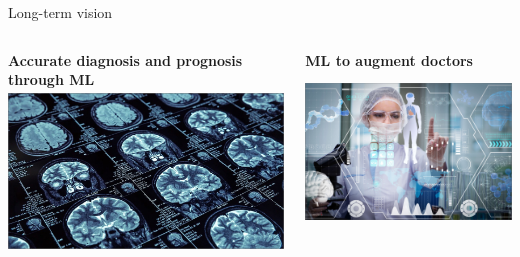 \documentclass[8pt,xcolor=table,aspectratio=169]{beamer}
\begin{document}
\begin{frame}{Long-term vision}

\vspace{-2em}
\begin{columns}[t]
\begin{column}{0.5\textwidth}
\centering

\textbf{\large Accurate diagnosis and prognosis through ML}\\
\includegraphics[height=4.3cm]{ai-diagnosis}


\end{column}
\begin{column}{0.5\textwidth}
\centering

\textbf{\large ML to augment doctors}\\
\includegraphics[height=4.3cm]{ai_augment_full}

\end{column}
\end{columns}

\end{frame}
\end{document}
